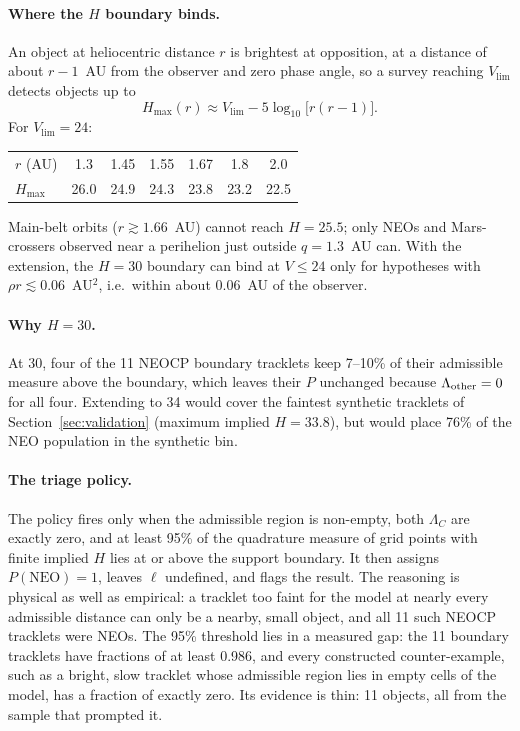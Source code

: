 \documentclass[linenumbers,twocolumn]{aastex701}
\begin{document}
\paragraph{Where the $H$ boundary binds.}
An object at heliocentric distance $r$ is brightest at opposition, at a
distance of about $r-1$~AU from the observer and zero phase angle, so a
survey reaching $V_{\lim}$ detects objects up to
\begin{equation}
H_{\max}(r)\approx V_{\lim}-5\log_{10}\bigl[r(r-1)\bigr].
\label{eq:hmax}
\end{equation}
For $V_{\lim}=24$:
\begin{center}
\begin{tabular}{lcccccc}
\hline
$r$ (AU) & 1.3 & 1.45 & 1.55 & 1.67 & 1.8 & 2.0 \\
$H_{\max}$ & 26.0 & 24.9 & 24.3 & 23.8 & 23.2 & 22.5 \\
\hline
\end{tabular}
\end{center}
Main-belt orbits ($r\gtrsim1.66$~AU) cannot reach $H=25.5$; only NEOs and
Mars-crossers observed near a perihelion just outside $q=1.3$~AU can. With the
extension, the $H=30$ boundary can bind at $V\le24$ only for hypotheses with
$\rho r\lesssim0.06$~AU$^2$, i.e.\ within about 0.06~AU of the observer.

\paragraph{Why $H=30$.}
At 30, four of the 11 NEOCP boundary tracklets keep 7--10\% of their
admissible measure above the boundary, which leaves their $P$ unchanged
because $\Lambda_{\rm other}=0$ for all four. Extending to 34 would cover the
faintest synthetic tracklets of Section~\ref{sec:validation} (maximum implied
$H=33.8$), but would place 76\% of the NEO population in the synthetic bin.

\paragraph{The triage policy.}
The policy fires only when the admissible region is non-empty, both
$\Lambda_C$ are exactly zero, and at least 95\% of the quadrature measure of
grid points with finite implied $H$ lies at or above the support boundary. It then
assigns $P(\mathrm{NEO})=1$, leaves $\ell$ undefined, and flags the result.
The reasoning is physical as well as empirical: a tracklet too faint for the
model at nearly every admissible distance can only be a nearby, small object,
and all 11 such NEOCP tracklets were NEOs.
The 95\% threshold lies in a measured gap: the 11 boundary tracklets have
fractions of at least 0.986, and every constructed counter-example, such as a
bright, slow tracklet whose admissible region lies in empty cells of the
model, has a fraction of exactly zero. Its evidence is thin: 11 objects,
all from the sample that prompted it.
\end{document}
